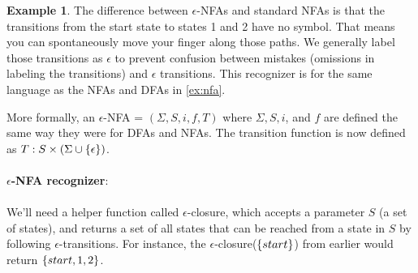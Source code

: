 \documentclass[]{article}
\DeclarePairedDelimiter{\set}{\lbrace}{\rbrace}
\theoremstyle{definition}
\newtheorem{ex}{Example}[section]
\begin{document}
\begin{ex}
				The difference between $\epsilon$-NFAs and standard NFAs is that the transitions from the start state to states 1 and 2 have no symbol. That means you can spontaneously move your finger along those paths. We generally label those transitions as $\epsilon$ to prevent confusion between mistakes (omissions in labeling the transitions) and $\epsilon$ transitions. This recognizer is for the same language as the NFAs and DFAs in \ref{ex:nfa}.
			\end{ex}

			More formally, an $\epsilon$-NFA = $(\Sigma, S, i, f, T)$ where $\Sigma, S, i$, and $f$ are defined the same way they were for DFAs and NFAs. The transition function is now defined as $T: S \times (\Sigma \cup \set{\epsilon} )$.
			\\ \\
			\textbf{$\epsilon$-NFA recognizer}:
			\\ \\
			We'll need a helper function called $\epsilon$-closure, which accepts a parameter $S$ (a set of states), and returns a set of all states that can be reached from a state in $S$ by following $\epsilon$-transitions. For instance, the $\epsilon$-closure($\set{start}$) from earlier would return $\set{start, 1, 2}$.
\end{document}
